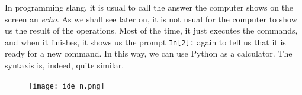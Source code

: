 \begin{paracol}{2}
In programming slang, it is usual to call the answer the computer shows on the screen an \emph{echo}. As we shall see later on, it is not usual for the computer to show us the result of the operations. Most of the time, it just executes the commands, and when it finishes, it shows us the prompt \texttt{In[2]:} again to tell us that it is ready for a new command. In this way, we can use Python as a calculator. The syntaxis is, indeed, quite similar.
\end{paracol}

\begin{figure}
	\centering
		\texttt{[image: ide\_n.png]}
	\label{fig:ide}
\end{figure}

